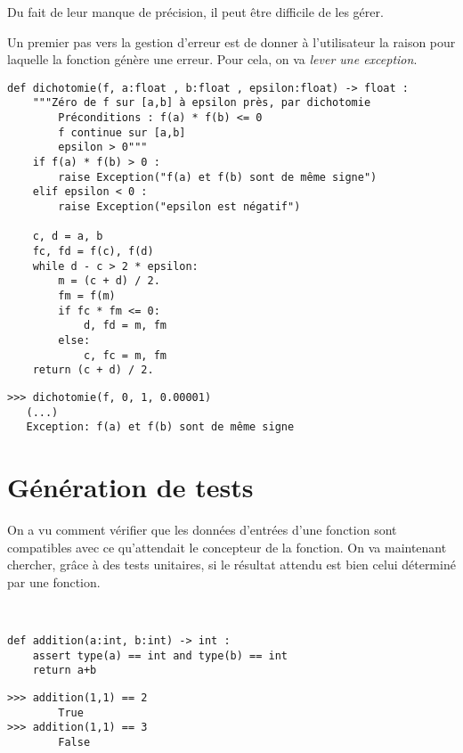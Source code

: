 Du fait de leur manque de précision, il peut être difficile de les gérer. 

Un premier pas vers la gestion d'erreur est de donner à l'utilisateur la raison pour laquelle la fonction génère une erreur. 
Pour cela, on va \textit{lever une exception}.

\begin{lstlisting}
def dichotomie(f, a:float , b:float , epsilon:float) -> float :
    """Zéro de f sur [a,b] à epsilon près, par dichotomie
        Préconditions : f(a) * f(b) <= 0
        f continue sur [a,b]
        epsilon > 0"""
    if f(a) * f(b) > 0 : 
        raise Exception("f(a) et f(b) sont de même signe")
    elif epsilon < 0 :
        raise Exception("epsilon est négatif")

    c, d = a, b
    fc, fd = f(c), f(d)
    while d - c > 2 * epsilon:
        m = (c + d) / 2.
        fm = f(m)
        if fc * fm <= 0:
            d, fd = m, fm
        else:
            c, fc = m, fm
    return (c + d) / 2.
\end{lstlisting}

\begin{lstlisting}
>>> dichotomie(f, 0, 1, 0.00001)
   (...)
   Exception: f(a) et f(b) sont de même signe
\end{lstlisting}

\section{Génération de tests}

On a vu comment vérifier que les données d'entrées d'une fonction sont compatibles avec ce qu'attendait le concepteur de la fonction. On va maintenant chercher, grâce à des tests unitaires, si le résultat attendu est bien celui déterminé par une fonction. 
\begin{exemple}~\\
\begin{minipage}[c]{.5\linewidth}
\begin{lstlisting}
def addition(a:int, b:int) -> int : 
    assert type(a) == int and type(b) == int
    return a+b
\end{lstlisting}
\end{minipage} \hfill
\begin{minipage}[c]{.45\linewidth}
\begin{lstlisting}
>>> addition(1,1) == 2
        True
>>> addition(1,1) == 3
        False
\end{lstlisting}
\end{minipage} 

\end{exemple}

